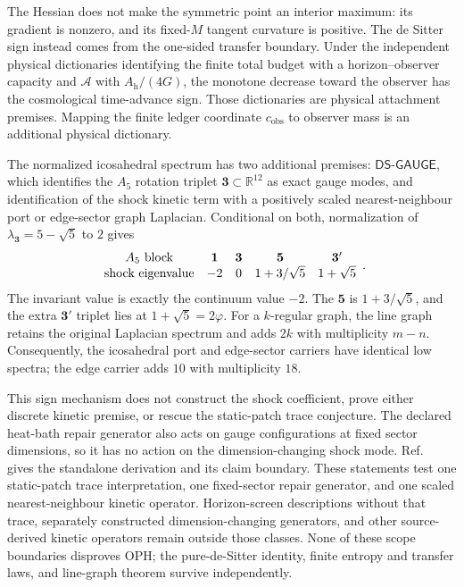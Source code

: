 \documentclass[11pt]{article}
\begin{document}
The Hessian does not make the symmetric point an interior maximum: its
gradient is nonzero, and its fixed-\(M\) tangent curvature is positive. The
de Sitter sign instead comes from the one-sided transfer boundary. Under the
independent physical dictionaries identifying the finite total budget with a
horizon--observer capacity and \(\mathcal A\) with \(A_{\mathrm h}/(4G)\), the
monotone decrease toward the observer has the cosmological time-advance sign.
Those dictionaries are physical attachment premises. Mapping the finite
ledger coordinate \(c_{\mathrm{obs}}\) to observer mass is an additional
physical dictionary.

The normalized icosahedral spectrum has two additional premises:
\(\mathsf{DS\text{-}GAUGE}\), which identifies the \(A_5\) rotation triplet
\(\mathbf3\subset\mathbb R^{12}\) as exact gauge modes, and identification of the
shock kinetic term with a positively scaled nearest-neighbour port or
edge-sector graph Laplacian. Conditional on both, normalization of
\(\lambda_{\mathbf3}=5-\sqrt5\) to \(2\) gives
\[
\begin{array}{c@{\quad}c@{\quad}c@{\quad}c@{\quad}c}
A_5\text{ block}&\mathbf1&\mathbf3&\mathbf5&\mathbf3'\\
\text{shock eigenvalue}&-2&0&1+3/\sqrt5&1+\sqrt5
\end{array}.
\]
The invariant value is exactly the continuum value \(-2\). The
\(\mathbf5\) is \(1+3/\sqrt5\), and the extra \(\mathbf3'\) triplet lies at
\(1+\sqrt5=2\varphi\). For a \(k\)-regular graph, the line graph retains the
original Laplacian spectrum and adds \(2k\) with multiplicity \(m-n\).
Consequently, the icosahedral port and edge-sector carriers have identical
low spectra; the edge carrier adds \(10\) with multiplicity \(18\).

This sign mechanism does not construct the shock coefficient, prove either
discrete kinetic premise, or rescue the static-patch trace conjecture. The
declared heat-bath repair generator also acts on gauge configurations at
fixed sector dimensions, so it has no action on the dimension-changing shock
mode. Ref.~\cite{ophdesittershock} gives the standalone derivation and its
claim boundary. These statements test one static-patch trace interpretation,
one fixed-sector repair generator, and one scaled nearest-neighbour kinetic
operator. Horizon-screen descriptions without that trace, separately
constructed dimension-changing generators, and other source-derived kinetic
operators remain outside those classes. None of these scope boundaries
disproves OPH; the pure-de-Sitter identity, finite entropy and transfer laws,
and line-graph theorem survive independently.
\end{document}
